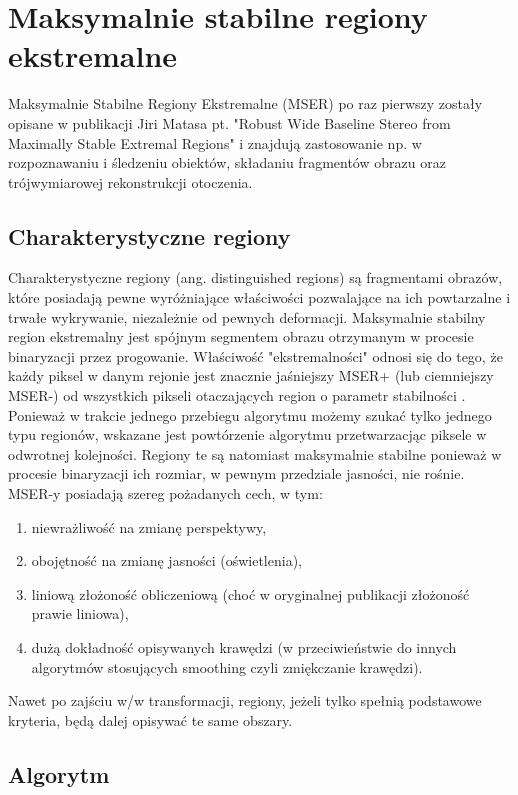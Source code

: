\chapter{Maksymalnie stabilne regiony ekstremalne}

Maksymalnie Stabilne Regiony Ekstremalne (MSER) po raz pierwszy zostały opisane
w publikacji Jiri Matasa pt. "Robust Wide Baseline Stereo from Maximally Stable
Extremal Regions" i znajdują zastosowanie np. w rozpoznawaniu i śledzeniu
obiektów, składaniu fragmentów obrazu oraz trójwymiarowej rekonstrukcji
otoczenia.

\section{Charakterystyczne regiony}

Charakterystyczne regiony (ang. distinguished regions) są fragmentami obrazów,
które posiadają pewne wyróżniające właściwości pozwalające na ich powtarzalne i
trwałe wykrywanie, niezależnie od pewnych deformacji. Maksymalnie stabilny
region ekstremalny jest spójnym segmentem obrazu otrzymanym w procesie
binaryzacji przez progowanie. Właściwość "ekstremalności" odnosi się do tego,
że każdy piksel w danym rejonie jest znacznie jaśniejszy MSER+ (lub ciemniejszy
MSER-) od wszystkich pikseli otaczających region o parametr stabilności
. Ponieważ w trakcie jednego przebiegu algorytmu możemy szukać
tylko jednego typu regionów, wskazane jest powtórzenie algorytmu przetwarzacjąc 
piksele w odwrotnej kolejności. Regiony te są natomiast maksymalnie stabilne
ponieważ w procesie binaryzacji ich rozmiar, w pewnym przedziale jasności, nie
rośnie. MSER-y posiadają szereg pożadanych cech, w tym: 
\begin{enumerate} \item niewrażliwość na zmianę perspektywy, \item obojętność
    na zmianę jasności (oświetlenia), \item liniową złożoność obliczeniową
    (choć w oryginalnej publikacji złożoność prawie liniowa), \item dużą
    dokładność opisywanych krawędzi (w przeciwieństwie do innych algorytmów
    stosujących smoothing czyli zmiękczanie krawędzi).  
\end{enumerate}

Nawet po zajściu w/w transformacji, regiony, jeżeli tylko
spełnią podstawowe kryteria, będą dalej opisywać te same obszary.

\section{Algorytm}

